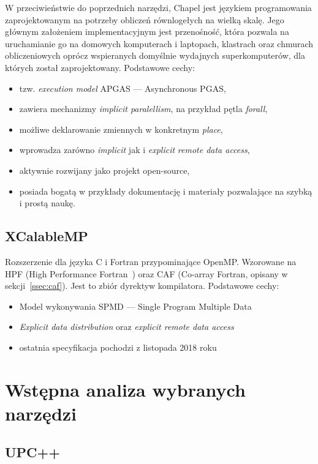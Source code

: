 \documentclass[twocolumn]{article}
\begin{document}
W przeciwieństwie do poprzednich narzędzi,
Chapel jest językiem programowania zaprojektowanym na potrzeby obliczeń równlogełych na wielką skalę.
Jego głównym założeniem implementacyjnym jest przenośność, która pozwala na uruchamianie go
na domowych komputerach i laptopach, klastrach oraz chmurach obliczeniowych oprócz wspieranych domyślnie
wydajnych superkomputerów, dla których został zaprojektowany.
Podstawowe cechy:
\begin{itemize}
    \item tzw. \textit{execution model} APGAS --- Asynchronous PGAS,
    \item zawiera mechanizmy \textit{implicit paralellism}, na przykład pętla \textit{forall},
    \item możliwe deklarowanie zmiennych w konkretnym \textit{place},
    \item wprowadza zarówno \textit{implicit} jak i \textit{explicit} \textit{remote data access},
    \item aktywnie rozwijany jako projekt open-source,
    \item posiada bogatą w przykłady dokumentację i materiały pozwalające na szybką
    i prostą naukę.
\end{itemize}

\subsection{XCalableMP}

Rozszerzenie dla języka C i Fortran przypominające OpenMP.
Wzorowane na HPF (High Performance Fortran~\cite{pgas_paper}) oraz
CAF (Co-array Fortran, opisany w sekcji~\ref{ssec:caf}).
Jest to zbiór dyrektyw kompilatora.
Podstawowe cechy:
\begin{itemize}
    \item Model wykonywania SPMD --- Single Program Multiple Data
    \item \textit{Explicit data distribution} oraz \textit{explicit remote data access}
    \item ostatnia specyfikacja pochodzi z listopada 2018 roku~\cite{xmphome}
\end{itemize}

\section{Wstępna analiza wybranych narzędzi}

\subsection{UPC++}
\end{document}
